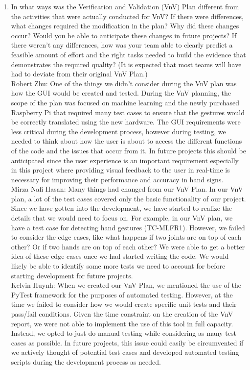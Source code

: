 \documentclass[12pt, titlepage]{article}
\begin{document}
\begin{enumerate}
  \item In what ways was the Verification and Validation (VnV) Plan different
  from the activities that were actually conducted for VnV?  If there were
  differences, what changes required the modification in the plan?  Why did
  these changes occur?  Would you be able to anticipate these changes in future
  projects?  If there weren't any differences, how was your team able to clearly
  predict a feasible amount of effort and the right tasks needed to build the
  evidence that demonstrates the required quality?  (It is expected that most
  teams will have had to deviate from their original VnV Plan.)\\

  Robert Zhu: One of the things we didn’t consider during the VnV plan was how the 
  GUI would be created and tested. During the VnV planning, the scope of the plan was 
  focused on machine learning and the newly purchased Raspberry Pi that required many 
  test cases to ensure that the gestures would be correctly translated using the new 
  hardware. The GUI requirements were less critical during the development process, 
  however during testing, we needed to think about how the user is about to access 
  the different functions of the code and the issues that occur from it. In future 
  projects this should be anticipated since the user experience is an important 
  requirement especially in this project where providing visual feedback to the user 
  in real-time is necessary for improving their performance and accuracy in hand signs.\\
  
  Mirza Nafi Hasan: Many things had changed from our VnV Plan. In our VnV plan, a lot 
  of the test cases covered only the basic functionality of our project. Since we have 
  gotten into the development, we have started to realize the details that we would need 
  to focus on. For example, in our VnV plan, we have a test case for detecting hand 
  gestures (TC-MLFR1). However, we failed to consider the edge cases, like what happens
  if two joints are on top of each other? Or if two hands are on top of each other? We 
  were able to get a better idea of these edge cases once we had started writing the 
  code. We would likely be able to identify some more tests we need to account for 
  before starting development for future projects.\\

  Kelvin Huynh: When we created our VnV Plan, we mentioned the use of the PyTest framework for 
  the purposes of automated testing. However, at the time we failed to consider how we would create 
  specific unit tests and their pass/fail conditions. Given the time constraint on the creation of the 
  VnV report, we were not able to implement the use of this tool in full capacity. Instead, we opted to 
  just do manual testing while considering as many test cases as possible. In future projects, this issue 
  could easily be circumvented if we actively thought of potential test cases and developed automated testing 
  scripts during the development process as needed.\\
  

\end{enumerate}
\end{document}
